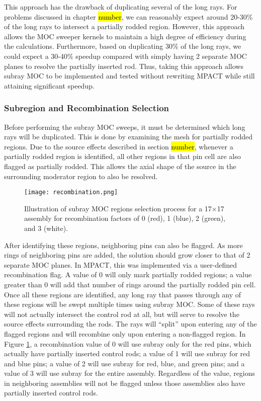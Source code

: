 This approach has the drawback of duplicating several of the long rays.  For problems discussed in chapter \hl{number}, we can reasonably expect around 20-30\% of the long rays to intersect a partially rodded region.  However, this approach allows the MOC sweeper kernels to maintain a high degree of efficiency during the calculations.  Furthermore, based on duplicating 30\% of the long rays, we could expect a 30-40\% speedup compared with simply having 2 separate MOC planes to resolve the partially inserted rod.  Thus, taking this approach allows subray MOC to be implemented and tested without rewriting MPACT while still attaining significant speedup.

\subsubsection{Subregion and Recombination Selection}

Before performing the subray MOC sweeps, it must be determined which long rays will be duplicated.  This is done by examining the mesh for partially rodded regions.  Due to the source effects described in section \hl{number}, whenever a partially rodded region is identified, all other regions in that pin cell are also flagged as partially rodded.  This allows the axial shape of the source in the surrounding moderator region to also be resolved.

\begin{figure}
    \centering
    \texttt{[image: recombination.png]}
    \caption{Illustration of subray MOC regions selection process for a 17$\times$17 assembly for recombination factors of 0 (red), 1 (blue), 2 (green), and 3 (white).}\label{f:recombination}
\end{figure}

After identifying these regions, neighboring pins can also be flagged.  As more rings of neighboring pins are added, the solution should grow closer to that of 2 separate MOC planes.  In MPACT, this was implemented via a user-defined recombination flag.  A value of 0 will only mark partially rodded regions; a value greater than 0 will add that number of rings around the partially rodded pin cell.  Once all these regions are identified, any long ray that passes through any of these regions will be swept multiple times using subray MOC.  Some of these rays will not actually intersect the control rod at all, but will serve to resolve the source effects surrounding the rods.  The rays will ``split'' upon entering any of the flagged regions and will recombine only upon entering a non-flagged region.  In Figure \ref{f:recombination}, a recombination value of 0 will use subray only for the red pins, which actually have partially inserted control rods; a value of 1 will use subray for red and blue pins; a value of 2 will use subray for red, blue, and green pins; and a value of 3 will use subray for the entire assembly.  Regardless of the value, regions in neighboring assemblies will not be flagged unless those assemblies also have partially inserted control rods.

